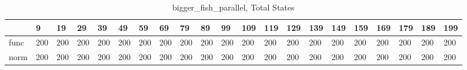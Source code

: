\begin{table}
\centering
\caption{bigger_fish_parallel, Total States}
\label{bigger_fish_parallel_total}
\begin{tabular}{lllllllllllllllllllll}
\toprule
{} &    9 &   19 &   29 &   39 &   49 &   59 &   69 &   79 &   89 &   99 &  109 &  119 &  129 &  139 &  149 &  159 &  169 &  179 &  189 &  199 \\
\midrule
func &  200 &  200 &  200 &  200 &  200 &  200 &  200 &  200 &  200 &  200 &  200 &  200 &  200 &  200 &  200 &  200 &  200 &  200 &  200 &  200 \\
norm &  200 &  200 &  200 &  200 &  200 &  200 &  200 &  200 &  200 &  200 &  200 &  200 &  200 &  200 &  200 &  200 &  200 &  200 &  200 &  200 \\
\bottomrule
\end{tabular}
\end{table}
